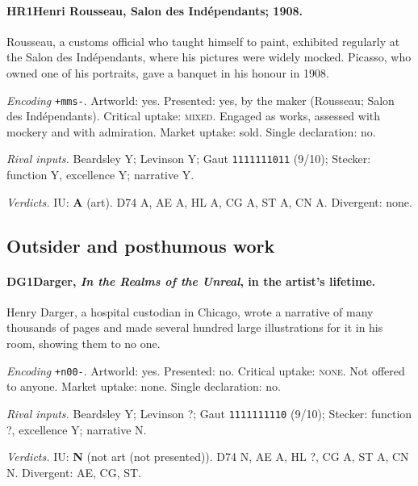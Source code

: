 \paragraph{HR1\enspace Henri Rousseau, Salon des Ind\'ependants; 1908.}
Rousseau, a customs official who taught himself to paint, exhibited regularly at the Salon des Ind\'ependants, where his pictures were widely mocked. Picasso, who owned one of his portraits, gave a banquet in his honour in 1908.\par
\noindent\textit{Encoding} \texttt{+mms-}. Artworld: yes. Presented: yes, by the maker (Rousseau; Salon des Ind\'ependants). Critical uptake: \textsc{mixed}. Engaged as works, assessed with mockery and with admiration. Market uptake: sold. Single declaration: no.\par
\noindent\textit{Rival inputs.} Beardsley Y; Levinson Y; Gaut \texttt{1111111011} (9/10); Stecker: function Y, excellence Y; narrative Y.\par
\noindent\textit{Verdicts.} IU: \textbf{A} (art). D74 A, AE A, HL A, CG A, ST A, CN A. Divergent: none.\par

\subsection{Outsider and posthumous work}

\paragraph{DG1\enspace Darger, \emph{In the Realms of the Unreal}, in the artist's lifetime.}
Henry Darger, a hospital custodian in Chicago, wrote a narrative of many thousands of pages and made several hundred large illustrations for it in his room, showing them to no one.\par
\noindent\textit{Encoding} \texttt{+n00-}. Artworld: yes. Presented: no. Critical uptake: \textsc{none}. Not offered to anyone. Market uptake: none. Single declaration: no.\par
\noindent\textit{Rival inputs.} Beardsley Y; Levinson ?; Gaut \texttt{1111111110} (9/10); Stecker: function ?, excellence Y; narrative N.\par
\noindent\textit{Verdicts.} IU: \textbf{N} (not art (not presented)). D74 N, AE A, HL ?, CG A, ST A, CN N. Divergent: AE, CG, ST.\par

